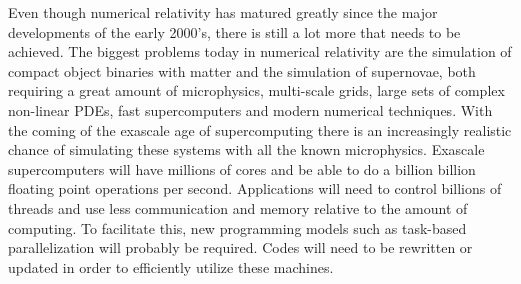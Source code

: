 Even though numerical relativity has matured greatly since the major developments of the early 2000's, there is still a lot more that needs to be achieved. The biggest problems today in numerical relativity are the simulation of compact object binaries with matter and the simulation of supernovae, both requiring a great amount of microphysics, multi-scale grids, large sets of complex non-linear PDEs, fast supercomputers and modern numerical techniques. With the coming of the exascale age of supercomputing there is an increasingly realistic chance of simulating these systems with all the known microphysics. Exascale supercomputers will have millions of cores and be able to do a billion billion floating point operations per second. Applications will need to control billions of threads and use less communication and memory relative to the amount of computing. To facilitate this, new programming models such as task-based parallelization will probably be required. Codes will need to be rewritten or updated in order to efficiently utilize these machines.

